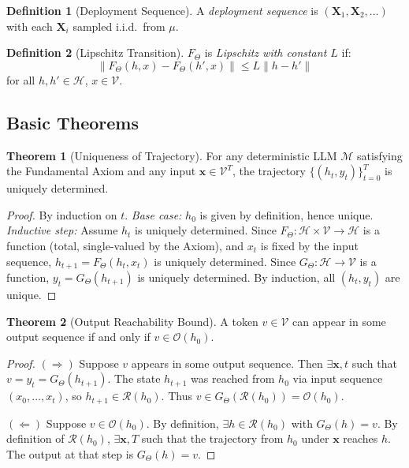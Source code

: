 \documentclass[11pt]{article}
\theoremstyle{definition}
\newtheorem{definition}{Definition}[section]
\newtheorem{theorem}{Theorem}[section]
\theoremstyle{remark}
\begin{document}
\begin{definition}[Deployment Sequence]
A \emph{deployment sequence} is $(\mathbf{X}_1, \mathbf{X}_2, \ldots)$ with each $\mathbf{X}_i$ sampled i.i.d.\ from $\mu$.
\end{definition}

\begin{definition}[Lipschitz Transition]
$F_\Theta$ is \emph{Lipschitz with constant $L$} if:
\begin{equation}
\|F_\Theta(h, x) - F_\Theta(h', x)\| \leq L\|h - h'\|
\end{equation}
for all $h, h' \in \mathcal{H}$, $x \in \mathcal{V}$.
\end{definition}

\subsection{Basic Theorems}

\begin{theorem}[Uniqueness of Trajectory]
For any deterministic LLM $\mathcal{M}$ satisfying the Fundamental Axiom and any input $\mathbf{x} \in \mathcal{V}^T$, the trajectory $\{(h_t, y_t)\}_{t=0}^T$ is uniquely determined.
\end{theorem}

\begin{proof}
By induction on $t$. \emph{Base case:} $h_0$ is given by definition, hence unique. \emph{Inductive step:} Assume $h_t$ is uniquely determined. Since $F_\Theta: \mathcal{H} \times \mathcal{V} \to \mathcal{H}$ is a function (total, single-valued by the Axiom), and $x_t$ is fixed by the input sequence, $h_{t+1} = F_\Theta(h_t, x_t)$ is uniquely determined. Since $G_\Theta: \mathcal{H} \to \mathcal{V}$ is a function, $y_t = G_\Theta(h_{t+1})$ is uniquely determined. By induction, all $(h_t, y_t)$ are unique.
\end{proof}

\begin{theorem}[Output Reachability Bound]
A token $v \in \mathcal{V}$ can appear in some output sequence if and only if $v \in \mathcal{O}(h_0)$.
\end{theorem}

\begin{proof}
$(\Rightarrow)$ Suppose $v$ appears in some output sequence. Then $\exists \mathbf{x}, t$ such that $v = y_t = G_\Theta(h_{t+1})$. The state $h_{t+1}$ was reached from $h_0$ via input sequence $(x_0, \ldots, x_t)$, so $h_{t+1} \in \mathcal{R}(h_0)$. Thus $v \in G_\Theta(\mathcal{R}(h_0)) = \mathcal{O}(h_0)$.

$(\Leftarrow)$ Suppose $v \in \mathcal{O}(h_0)$. By definition, $\exists h \in \mathcal{R}(h_0)$ with $G_\Theta(h) = v$. By definition of $\mathcal{R}(h_0)$, $\exists \mathbf{x}, T$ such that the trajectory from $h_0$ under $\mathbf{x}$ reaches $h$. The output at that step is $G_\Theta(h) = v$.
\end{proof}
\end{document}
